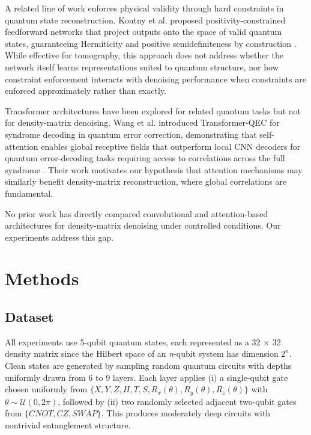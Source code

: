\documentclass[a4paper, 11pt, colorlinks=true, citecolor=., linkcolor=black, urlcolor=black]{article}
\begin{document}
A related line of work enforces physical validity through hard constraints in quantum state reconstruction. Koutny et al. proposed positivity-constrained feedforward networks that project outputs onto the space of valid quantum states, guaranteeing Hermiticity and positive semidefiniteness by construction \autocite{PhysRevA.106.012409}. While effective for tomography, this approach does not address whether the network itself learns representations suited to quantum structure, nor how constraint enforcement interacts with denoising performance when constraints are enforced approximately rather than exactly.

Transformer architectures have been explored for related quantum tasks but not for density-matrix denoising. Wang et al. introduced Transformer-QEC for syndrome decoding in quantum error correction, demonstrating that self-attention enables global receptive fields that outperform local CNN decoders for quantum error-decoding tasks requiring access to correlations across the full syndrome \autocite{wang2023transformerqecquantumerrorcorrection}. Their work motivates our hypothesis that attention mechanisms may similarly benefit density-matrix reconstruction, where global correlations are fundamental.

No prior work has directly compared convolutional and attention-based architectures for density-matrix denoising under controlled conditions. Our experiments address this gap.
\section{Methods}
\label{sec:org139b0a2}
\subsection{Dataset}
\label{sec:org927ed95}
All experiments use 5-qubit quantum states, each represented as a 32 \(\times\) 32 density matrix since the Hilbert space of an \emph{n}-qubit system has dimension \(2^n\). Clean states are generated by sampling random quantum circuits with depths uniformly drawn from 6 to 9 layers. Each layer applies (i) a single-qubit gate chosen uniformly from \(\{X, Y, Z, H, T, S, R_x(\theta), R_y(\theta), R_z(\theta)\}\) with \(\theta \sim \mathcal{U}(0, 2\pi)\), followed by (ii) two randomly selected adjacent two-qubit gates from \(\{CNOT, CZ, SWAP\}\). This produces moderately deep circuits with nontrivial entanglement structure.
\end{document}
